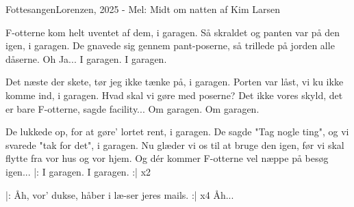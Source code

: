 \begin{sang}{Fottesangen}{Lorenzen, 2025 - Mel: Midt om natten af Kim Larsen}

\begin{vers}
F-otterne kom helt uventet af dem, i garagen.
Så skraldet og panten var på den igen, i garagen.
De gnavede sig gennem pant-poserne,
så trillede på jorden alle dåserne.
Oh Ja...
I garagen. I garagen.
\end{vers}

\begin{vers}
Det næste der skete, tør jeg ikke tænke på, i garagen.
Porten var låst, vi ku ikke komme ind, i garagen.
Hvad skal vi gøre med poserne?
Det ikke vores skyld, det er bare F-otterne,
sagde facility...
Om garagen. Om garagen.
\end{vers}

\begin{vers}
De lukkede op, for at gøre' lortet rent, i garagen.
De sagde "Tag nogle ting", og vi svarede "tak for det", i garagen.
Nu glæder vi os til at bruge den igen,
før vi skal flytte fra vor hus og vor hjem.
Og dér kommer F-otterne vel næppe på besøg
igen...
|: I garagen. I garagen. :| x2
\end{vers}

\begin{omkvaed}
|: Åh, vor' dukse, håber i læ-ser jeres mails. :| x4
Åh...
\end{omkvaed}
\end{sang}
